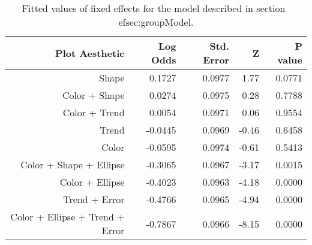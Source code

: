 \begin{table}[ht]
\centering
\begin{tabular}{rrrrr}
  \hline
Plot Aesthetic & Log Odds & Std. Error & Z & P value \\ 
  \hline
Shape & 0.1727 & 0.0977 & 1.77 & 0.0771 \\ 
  Color + Shape & 0.0274 & 0.0975 & 0.28 & 0.7788 \\ 
  Color + Trend & 0.0054 & 0.0971 & 0.06 & 0.9554 \\ 
  Trend & -0.0445 & 0.0969 & -0.46 & 0.6458 \\ 
  Color & -0.0595 & 0.0974 & -0.61 & 0.5413 \\ 
  Color + Shape + Ellipse & -0.3065 & 0.0967 & -3.17 & 0.0015 \\ 
  Color + Ellipse & -0.4023 & 0.0963 & -4.18 & 0.0000 \\ 
  Trend + Error & -0.4766 & 0.0965 & -4.94 & 0.0000 \\ 
  Color + Ellipse + Trend + Error & -0.7867 & 0.0966 & -8.15 & 0.0000 \\ 
   \hline
\end{tabular}
\caption[Fixed effects for group target logistic model]{Fitted values of fixed effects for the model described in section~
ef{sec:groupModel}.} 
\label{tab:group.fixef}
\end{table}
